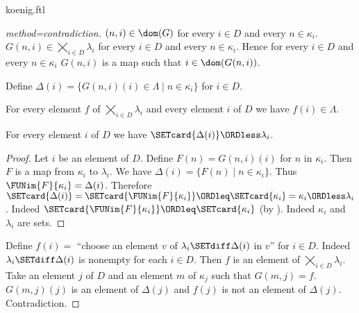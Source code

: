 \documentclass{article}
\newcommand{\ProdSet}[2]{\bigtimes_{i \in #2} #1_{i}}
\begin{document}
\begin{smodule}{koenig.ftl}
\begin{forthel}
\begin{proof}[method=contradiction]
    $(n,i) \in \dom(G)$ for every $i \in D$ and every $n \in \kappa_{i}$.
    $G(n,i) \in \ProdSet{\lambda}{D}$ for every $i \in D$ and every $n \in \kappa_{i}$.
    Hence for every $i \in D$ and every $n \in \kappa_{i}$ $G(n,i)$ is a map such that $i \in \dom(G(n,i))$.

    Define $\Delta(i) = \{ G(n,i)(i) \in \Lambda \mid n \in \kappa_{i} \}$ for $i \in D$.

    For every element $f$ of $\ProdSet{\lambda}{D}$ and every element $i$ of $D$ we have $f(i) \in \Lambda$.

    For every element $i$ of $D$ we have $\SETcard{\Delta(i)} \ORDless \lambda_{i}$.
    \begin{proof}
      Let $i$ be an element of $D$.
      Define $F(n) = G(n,i)(i)$ for $n$ in $\kappa_{i}$.
      Then $F$ is a map from $\kappa_{i}$ to $\lambda_{i}$.
      We have $\Delta(i) = \{ F(n) \mid n \in \kappa_{i} \}$.
      Thus $\FUNim{F}{\kappa_{i}} = \Delta(i)$.
      Therefore $\SETcard{\Delta(i)}
        = \SETcard{\FUNim{F}{\kappa_{i}}}
        \ORDleq \SETcard{\kappa_{i}}
        = \kappa_{i}
        \ORDless \lambda_{i}$.
      Indeed $\SETcard{\FUNim{F}{\kappa_{i}}} \ORDleq \SETcard{\kappa_{i}}$ (by ).
      Indeed $\kappa_{i}$ and $\lambda_{i}$ are sets.
    \end{proof}

    Define $f(i) =$ ``choose an element $v$ of $\lambda_{i} \SETdiff \Delta(i)$ in $v$'' for $i \in D$.
    Indeed $\lambda_{i} \SETdiff \Delta(i)$ is nonempty for each $i \in D$.
    Then $f$ is an element of $\ProdSet{\lambda}{D}$.
    Take an element $j$ of $D$ and an element $m$ of $\kappa_{j}$ such that $G(m,j) = f$.
    $G(m,j)(j)$ is an element of $\Delta(j)$ and $f(j)$ is not an element of $\Delta(j)$.
    Contradiction.
  \end{proof}
\end{forthel}

\printbibliography
{}
\end{smodule}
\end{document}
